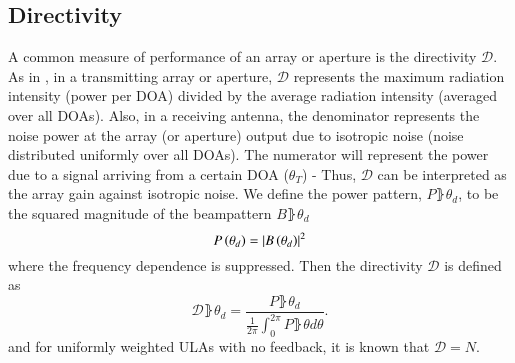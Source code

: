 \subsection{Directivity}
A common measure of performance of an array or aperture is the directivity $\mathcal{D}$.
As in \cite{van2004optimum}, in a transmitting array or aperture, $\mathcal{D}$ represents the maximum radiation intensity (power per DOA) divided by the average radiation intensity (averaged over all DOAs).
Also, in a receiving antenna, the denominator represents the noise power at the array (or aperture) output due to isotropic noise (noise distributed uniformly over all DOAs). 
The numerator will represent the power due to a signal arriving from a certain DOA ($\theta_{T}$) - Thus, $\mathcal{D}$ can be interpreted as the array gain against isotropic noise.
We define the power pattern, $P\rBrace{\theta_{d}}$, to be the squared magnitude of the beampattern $B\rBrace{\theta_{d}}$
\begin{equation}
    P\left({\theta_{d}}\right) = \left\vert B\left({\theta_{d}}\right)\right\vert^{2}
\end{equation}
where the frequency dependence is suppressed.
Then the directivity $\mathcal{D}$ is defined as
\begin{equation}\label{eq_D}
    \mathcal{D}\rBrace{\theta_{d}} = \frac{
    P\rBrace{\theta_{d}}
    }{
    \frac{1}{2\pi}\int_{0}^{2\pi}P\rBrace{\theta}d\theta
    }.
\end{equation}
and for uniformly weighted ULAs with no feedback, it is known \cite{van2004optimum} that $\mathcal{D} = N$.
